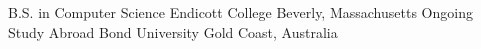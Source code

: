 

\begin{cventries}

  \cventry
    {B.S. in Computer Science} %
    {Endicott College} %
    {Beverly, Massachusetts} %
    {Ongoing} %
    {}
  \vspace{-1.5mm}
  \cventry
    {Study Abroad} %
    {Bond University} %
    {Gold Coast, Australia} %
    {} %
    {}

\end{cventries}
